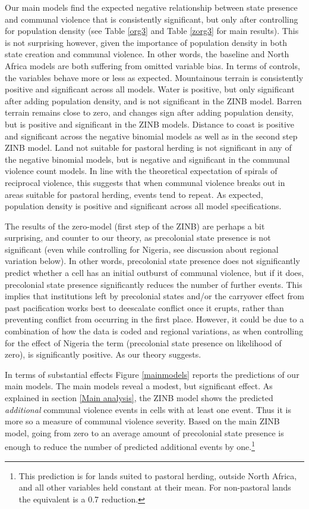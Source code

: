 Our main models find the expected negative relationship between state presence
and communal violence that is consistently significant, but only after
controlling for population density (see Table \ref{org3} and Table \ref{zorg3}
for main results). This is not surprising however, given the importance of
population density in both state creation and communal violence. In other words,
the baseline and North Africa models are both suffering from omitted variable
bias. In terms of controls, the variables behave more or less as expected.
Mountainous terrain is consistently positive and significant across all models.
Water is positive, but only significant after adding population density, and is
not significant in the ZINB model. Barren terrain remains close to zero, and
changes sign after adding population density, but is positive and significant in
the ZINB models. Distance to coast is positive and significant across the
negative binomial models as well as in the second step ZINB model. Land not
suitable for pastoral herding is not significant in any of the negative binomial
models, but is negative and significant in the communal violence count models.
In line with the theoretical expectation of spirals of reciprocal violence, this
suggests that when communal violence breaks out in areas suitable for pastoral
herding, events tend to repeat. As expected, population density is positive and
significant across all model specifications. 

The results of the zero-model (first step of the ZINB) are perhaps a bit
surprising, and counter to our theory, as precolonial state presence is not
significant (even while controlling for Nigeria, see discussion about regional
variation below). In other words, precolonial state presence does not
significantly predict whether a cell has an initial outburst of communal
violence, but if it does, precolonial state presence significantly reduces the
number of further events. This implies that institutions left by precolonial
states and/or the carryover effect from past pacification works best to
deescalate conflict once it erupts, rather than preventing conflict from
occurring in the first place. However, it could be due to a combination of how
the data is coded and regional variations, as when controlling for the effect of
Nigeria the term (precolonial state presence on likelihood of zero), is
significantly positive. As our theory suggests.

In terms of substantial effects Figure \ref{mainmodels} reports the predictions
of our main models. The main models reveal a modest, but significant effect. As
explained in section \ref{Main analysis}, the ZINB model shows the predicted
\textit{additional} communal violence events in cells with at least one event.
Thus it is more so a measure of communal violence severity. Based on the main
ZINB model, going from zero to an average amount of precolonial state presence
is enough to reduce the number of predicted additional events by one.\footnote{
This prediction is for lands suited to pastoral herding, outside North Africa,
and all other variables held constant at their mean. For non-pastoral lands the
equivalent is a 0.7 reduction.}

